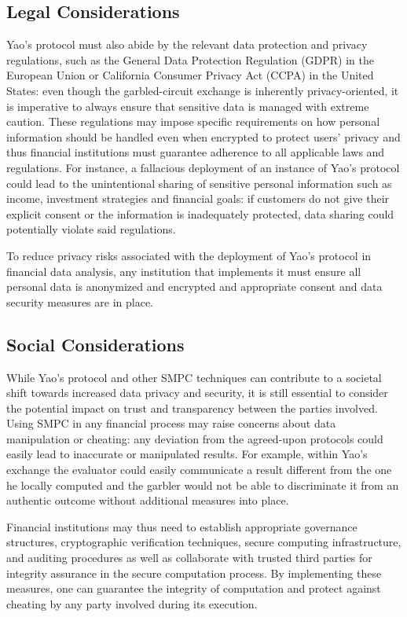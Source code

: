 \documentclass[12pt]{article}
\begin{document}
\subsection{Legal Considerations}

Yao's protocol must also abide by the relevant data protection and privacy regulations, such as the General Data Protection Regulation (GDPR) in the European Union or California Consumer Privacy Act (CCPA) in the United States: even though the garbled-circuit exchange is inherently privacy-oriented, it is imperative to always ensure that sensitive data is managed with extreme caution. These regulations may impose specific requirements on how personal information should be handled even when encrypted to protect users' privacy and thus financial institutions must guarantee adherence to all applicable laws and regulations. For instance, a fallacious deployment of an instance of Yao's protocol could lead to the unintentional sharing of sensitive personal information such as income, investment strategies and financial goals: if customers do not give their explicit consent or the information is inadequately protected, data sharing could potentially violate said regulations.

To reduce privacy risks associated with the deployment of Yao's protocol in financial data analysis, any institution that implements it must ensure all personal data is anonymized and encrypted and appropriate consent and data security measures are in place.

\subsection{Social Considerations}

While Yao's protocol and other SMPC techniques can contribute to a societal shift towards increased data privacy and security, it is still essential to consider the potential impact on trust and transparency between the parties involved. Using SMPC in any financial process may raise concerns about data manipulation or cheating: any deviation from the agreed-upon protocols could easily lead to inaccurate or manipulated results. For example, within Yao's exchange the evaluator could easily communicate a result different from the one he locally computed and the garbler would not be able to discriminate it from an authentic outcome without additional measures into place. 

Financial institutions may thus need to establish appropriate governance structures, cryptographic verification techniques, secure computing infrastructure, and auditing procedures as well as collaborate with trusted third parties for integrity assurance in the secure computation process. By implementing these measures, one can guarantee the integrity of computation and protect against cheating by any party involved during its execution.
\end{document}
